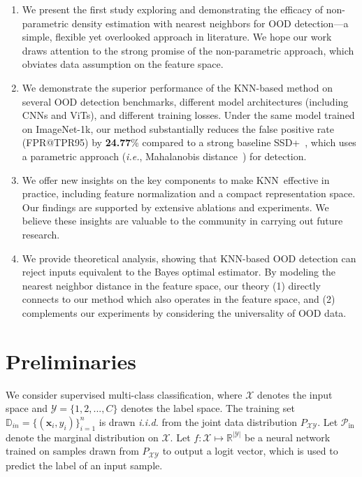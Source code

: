 \documentclass[nohyperref]{article}
\newcommand{\calX}{\mathcal{X}}
\newcommand{\calY}{\mathcal{Y}}
\newcommand{\bx}{\mathbf{x}}
\newcommand{\method}{{KNN}}
\theoremstyle{plain}
\theoremstyle{definition}
\theoremstyle{remark}
\begin{document}
\begin{enumerate}

\item We present the first study exploring and demonstrating the efficacy of non-parametric density estimation with nearest neighbors for OOD detection---a simple, flexible yet overlooked approach in literature. We hope our work draws attention to the strong promise of the non-parametric approach, which obviates data assumption on the feature space.

\item We demonstrate the superior performance of the KNN-based method on several OOD detection benchmarks, different model architectures (including CNNs and ViTs), and different training losses. Under the same model trained on ImageNet-1k, our method substantially reduces the false positive rate (FPR@TPR95) by \textbf{24.77}\% compared to a strong baseline {SSD+}~\citep{2021ssd}, which uses a parametric approach (\emph{i.e.}, Mahalanobis distance~\citep{lee2018simple}) for detection.


\item We offer new insights on the key components to make \method~effective in practice, including feature normalization and a compact representation space. Our findings are supported by extensive ablations and experiments. We believe these insights are valuable to the community in carrying out future research.

\item We provide theoretical analysis, showing that KNN-based OOD detection can reject inputs equivalent to the Bayes optimal estimator. By modeling the nearest neighbor distance in
the feature space, our theory (1) directly connects to our method which also operates in the feature space, and (2) complements our experiments by considering the universality of OOD data. 

\end{enumerate}


 





\section{Preliminaries}
\label{sec:prelim}


We consider supervised multi-class classification, where $\mathcal{X}$ denotes the input space and $\mathcal{Y}=\{1,2,...,C\}$ denotes the label space. The training set $\mathbb{D}_{in} = \{(\bx_i, y_i)\}_{i=1}^n$ is drawn \emph{i.i.d.} from the joint data distribution $P_{\mathcal{X}\mathcal{Y}}$. Let $\mathcal{P}_\text{in}$ denote the marginal distribution on $\mathcal{X}$. Let $f: \calX \mapsto \mathbb{R}^{|\calY|}$ be a neural network trained on samples drawn from $P_{\mathcal{X}\mathcal{Y}}$ to output a logit vector, which is used to predict the label of an input sample. 
 
\end{document}
